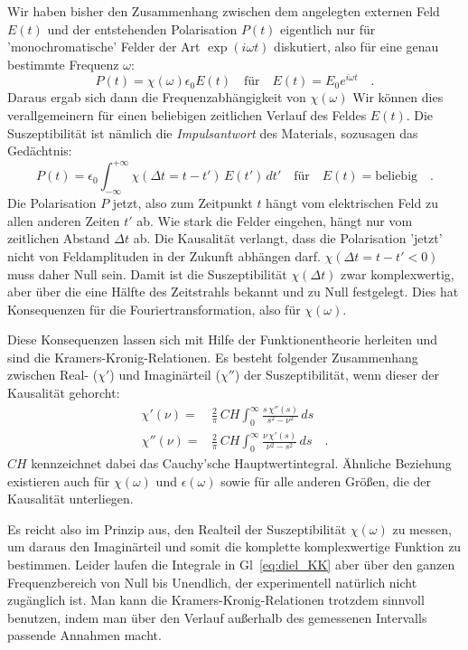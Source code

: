 Wir haben bisher den Zusammenhang zwischen dem angelegten externen Feld $E(t)$ und der entstehenden Polarisation $P(t)$ eigentlich nur für 'monochromatische' Felder der Art $\exp(i \omega t)$ diskutiert, also für eine genau bestimmte Frequenz $\omega$:
\begin{equation}
P(t) = \chi(\omega) \epsilon_0 E(t) \quad \text{für} \quad E(t) = E_0 e^{i \omega t} \quad .
\end{equation}
Daraus ergab sich dann die Frequenzabhängigkeit von $\chi(\omega)$ Wir können dies verallgemeinern für einen beliebigen zeitlichen Verlauf des Feldes  $E(t)$. Die Suszeptibilität ist nämlich die  \emph{Impulsantwort} des Materials, sozusagen das Gedächtnis:
\begin{equation}
P(t) = \epsilon_0 \int_{-\infty}^{+\infty} \chi( \Delta t = t - t') \, E(t') \, dt' \quad \text{für} \quad E(t) = \text{beliebig} \quad .
\end{equation}
Die Polarisation $P$ jetzt, also zum Zeitpunkt $t$ hängt vom elektrischen Feld zu allen anderen Zeiten $t'$ ab. Wie stark die Felder eingehen, hängt nur vom zeitlichen Abstand $\Delta t$ ab. Die Kausalität verlangt, dass die Polarisation 'jetzt' nicht von Feldamplituden in der Zukunft abhängen darf. $\chi( \Delta t = t - t' < 0) $ muss daher Null sein. Damit ist die Suszeptibilität $\chi( \Delta t ) $ zwar komplexwertig, aber über die eine Hälfte des Zeitstrahls bekannt und zu Null festgelegt. Dies hat Konsequenzen für die Fouriertransformation, also für $\chi(\omega)$.

Diese Konsequenzen lassen sich mit Hilfe der Funktionentheorie herleiten und sind die Kramers-Kronig-Relationen. Es besteht folgender Zusammenhang zwischen Real- ($\chi'$) und Imaginärteil  ($\chi''$) der Suszeptibilität, wenn dieser der Kausalität gehorcht:
\begin{align}
 \chi'(\nu) = & \frac{2}{\pi} \, CH \int_0^\infty \frac{s  \, \chi''(s)}{s^2 - \nu^2} \, ds \\
 \chi''(\nu) = & \frac{2}{\pi}\,  CH \int_0^\infty \frac{\nu \, \chi'(s)}{\nu^2 - s^2} \, ds  \quad .
 \label{eq:diel_KK}
\end{align}
$CH$ kennzeichnet dabei das Cauchy'sche Hauptwertintegral. Ähnliche Beziehung existieren auch für $\chi(\omega)$ und $\epsilon(\omega)$ sowie für alle anderen Größen, die der Kausalität unterliegen.

Es reicht also im Prinzip aus, den Realteil der Suszeptibilität $\chi(\omega)$ zu messen, um daraus den Imaginärteil und somit die komplette komplexwertige Funktion zu bestimmen. Leider laufen die Integrale in Gl~\ref{eq:diel_KK} aber über den ganzen Frequenzbereich von Null bis Unendlich, der experimentell natürlich nicht zugänglich ist. Man kann die Kramers-Kronig-Relationen trotzdem sinnvoll benutzen, indem man über den Verlauf außerhalb des gemessenen Intervalls passende Annahmen macht.


